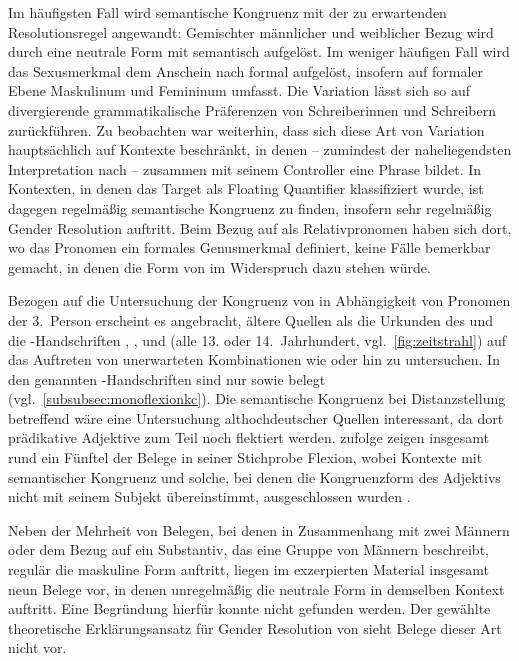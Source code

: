 Im häufigsten Fall wird semantische Kongruenz mit der zu erwartenden
Resolutionsregel angewandt: Gemischter männlicher und weiblicher Bezug wird
durch eine neutrale Form mit \mbox{} semantisch aufgelöst. Im weniger
häufigen Fall wird das Sexusmerkmal dem Anschein nach formal aufgelöst,
insofern  auf formaler Ebene Maskulinum und Femininum umfasst. Die
Variation lässt sich so auf divergierende grammatikalische Präferenzen von
Schreiberinnen und Schreibern zurück\-führen. Zu beobachten war weiterhin, dass
sich diese Art von Variation hauptsächlich auf Kontexte beschränkt, in denen
 -- zumindest der naheliegendsten Interpretation nach --
zusammen mit seinem Controller eine Phrase bildet. In Kontexten, in denen das
Target als Floating Quantifier klassifiziert wurde, ist dagegen regelmäßig
semantische Kongruenz zu finden, insofern sehr regelmäßig Gender Resolution
auftritt. Beim Bezug auf  als Relativpronomen haben sich dort, wo
das Pronomen ein formales Genusmerkmal definiert, keine Fälle bemerkbar
gemacht, in denen die Form von  im Widerspruch dazu stehen
würde.

Bezogen auf die Untersuchung der Kongruenz von  in Abhängigkeit
von Pro\-nomen der 3.~Person erscheint es angebracht, ältere Quellen als die
Urkunden des  und die \citet{kc}-Handschriften
\citet{kc:B1}, \citet{kc:C1}, \citet{kc:K} und \citet{kc:VB} (alle 13. oder
14.~Jahrhundert, vgl.~\cref{fig:zeitstrahl}) auf das Auftreten von unerwarteten
Kombinationen wie  oder  hin zu untersuchen.
In den genannten \citet{kc}-Handschriften sind nur 
sowie  belegt (vgl.~\cref{subsubsec:monoflexionkc}). Die
semantische Kongruenz bei Distanz\-stellung betreffend wäre eine Untersuchung
althochdeutscher Quellen interessant, da dort prädikative Adjektive zum
Teil noch flektiert werden. \citet[310--311]{fleischer2007} zufolge zeigen
insgesamt rund ein Fünftel der Belege in seiner Stichprobe Flexion, wobei
Kontexte mit semantischer Kongruenz und solche, bei denen die Kongruenzform des
Adjektivs nicht mit seinem Subjekt übereinstimmt, ausgeschlossen wurden
\autocite[304]{fleischer2007}.

Neben der Mehrheit von Belegen, bei denen in Zusammenhang mit zwei Männern oder
dem Bezug auf ein Substantiv, das eine Gruppe von Männern beschreibt, regulär
die maskuline Form  auftritt, liegen im exzerpierten Material
insgesamt neun Belege vor, in denen unregelmäßig die neutrale Form
 in demselben Kontext auftritt. Eine Begründung hierfür konnte
nicht gefunden werden. Der gewählte theoretische Erklärungsansatz für Gender
Resolution von \citet{wechslerzlatic2003,wechsler2009} sieht Belege dieser Art
nicht vor.

